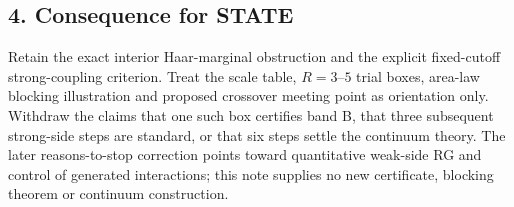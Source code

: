 \documentclass[11pt,a4paper]{article}
\begin{document}
\hypertarget{consequence-for-state}{%
\subsection{4. Consequence for STATE}\label{consequence-for-state}}

Retain the exact interior Haar-marginal obstruction and the explicit
fixed-cutoff strong-coupling criterion. Treat the scale table,
\(R=3\)--\(5\) trial boxes, area-law blocking illustration and proposed
crossover meeting point as orientation only. Withdraw the claims that
one such box certifies band B, that three subsequent strong-side steps
are standard, or that six steps settle the continuum theory. The later
reasons-to-stop correction points toward quantitative weak-side RG and
control of generated interactions; this note supplies no new
certificate, blocking theorem or continuum construction.
\end{document}
